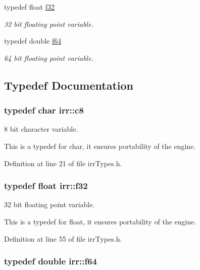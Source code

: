 \begin{CompactItemize}
typedef float \hyperlink{namespaceirr_0277be98d67dc26ff93b1a6a1d086b07}{f32}
\begin{CompactList}\small\item\em 32 bit floating point variable. \item\end{CompactList}\item 
typedef double \hyperlink{namespaceirr_1325b02603ad449f92c68fc640af9b28}{f64}
\begin{CompactList}\small\item\em 64 bit floating point variable. \item\end{CompactList}\end{CompactItemize}


\subsection{Typedef Documentation}
\hypertarget{namespaceirr_9395eaea339bcb546b319e9c96bf7410}{
\subsubsection[{c8}]{\setlength{\rightskip}{0pt plus 5cm}typedef char {\bf irr::c8}}}
\label{namespaceirr_9395eaea339bcb546b319e9c96bf7410}


8 bit character variable. 

This is a typedef for char, it ensures portability of the engine. 

Definition at line 21 of file irrTypes.h.\hypertarget{namespaceirr_0277be98d67dc26ff93b1a6a1d086b07}{
\subsubsection[{f32}]{\setlength{\rightskip}{0pt plus 5cm}typedef float {\bf irr::f32}}}
\label{namespaceirr_0277be98d67dc26ff93b1a6a1d086b07}


32 bit floating point variable. 

This is a typedef for float, it ensures portability of the engine. 

Definition at line 55 of file irrTypes.h.\hypertarget{namespaceirr_1325b02603ad449f92c68fc640af9b28}{
\subsubsection[{f64}]{\setlength{\rightskip}{0pt plus 5cm}typedef double {\bf irr::f64}}}
\label{namespaceirr_1325b02603ad449f92c68fc640af9b28}



